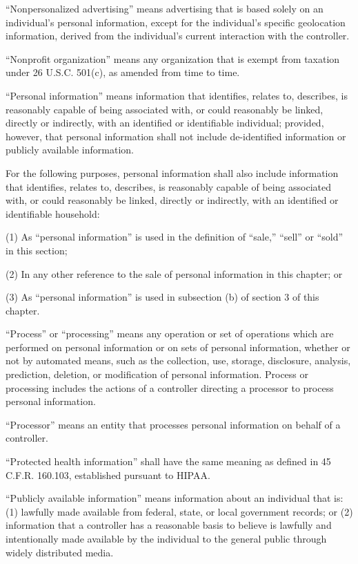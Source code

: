“Nonpersonalized advertising” means advertising that is based solely on an individual’s personal information, except for the individual’s specific geolocation information, derived from the individual’s current interaction with the controller.

“Nonprofit organization” means any organization that is exempt from taxation under 26 U.S.C. 501(c), as amended from time to time.

“Personal information” means information that identifies, relates to, describes, is reasonably capable of being associated with, or could reasonably be linked, directly or indirectly, with an identified or identifiable individual; provided, however, that personal information shall not include de-identified information or publicly available information.

For the following purposes, personal information shall also include information that identifies, relates to, describes, is reasonably capable of being associated with, or could reasonably be linked, directly or indirectly, with an identified or identifiable household:

(1) As “personal information” is used in the definition of “sale,” “sell” or “sold” in this section;

(2) In any other reference to the sale of personal information in this chapter; or

(3) As “personal information” is used in subsection (b) of section 3 of this chapter.

“Process” or “processing” means any operation or set of operations which are performed on personal information or on sets of personal information, whether or not by automated means, such as the collection, use, storage, disclosure, analysis, prediction, deletion, or modification of personal information. Process or processing includes the actions of a controller directing a processor to process personal information.

“Processor” means an entity that processes personal information on behalf of a controller.

“Protected health information” shall have the same meaning as defined in 45 C.F.R. 160.103, established pursuant to HIPAA.

“Publicly available information” means information about an individual that is: (1) lawfully made available from federal, state, or local government records; or (2) information that a controller has a reasonable basis to believe is lawfully and intentionally made available by the individual to the general public through widely distributed media.

